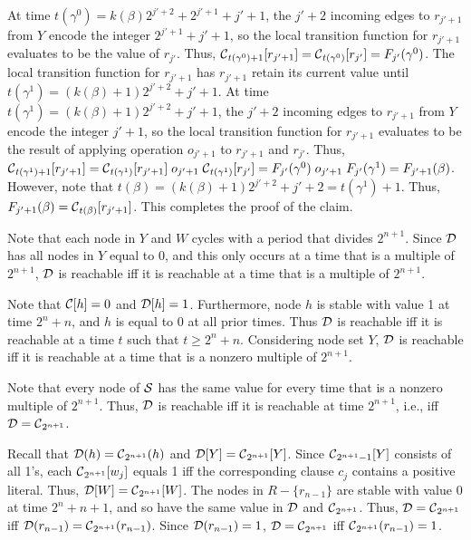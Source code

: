 At time $t(\gamma^0) = k(\beta)2^{j'+2}+2^{j'+1}+j'+1$,
the $j'+2$ incoming edges to $r_{j'+1}$ from $Y$ encode the integer $2^{j'+1}+j'+1$,
so the local transition function for $r_{j'+1}$ evaluates to be the value of $r_{j'}$.
Thus, $\mbox{$\mathcal{C}$}_{t(\gamma^0)+1}[r_{j'+1}] = \mbox{$\mathcal{C}$}_{t(\gamma^0)}[r_{j'}] = F_{j'}(\gamma^0)$.
The local transition function for $r_{j'+1}$ has $r_{j'+1}$ retain its current value until 
$t(\gamma^1) = (k(\beta)+1)2^{j'+2}+j'+1$.
At time $t(\gamma^1) =  (k(\beta)+1)2^{j'+2}+j'+1$,
the $j'+2$ incoming edges to $r_{j'+1}$ from $Y$ encode the integer $j'+1$,
so the local transition function for $r_{j'+1}$ evaluates to be the result
of applying operation $o_{j'+1}$ to  $r_{j'+1}$ and $r_{j'}$.
Thus, 
$\mbox{$\mathcal{C}$}_{t(\gamma^1)+1}[r_{j'+1}] = 
 \mbox{$\mathcal{C}$}_{t(\gamma^1)}[r_{j'+1}]  \; o_{j'+1} \; \mbox{$\mathcal{C}$}_{t(\gamma^1)}[r_{j'}] 
= F_{j'}(\gamma^0)  \; o_{j'+1} \; F_{j'}(\gamma^1) = F_{j'+1}(\beta)$.
However, note that $t(\beta) = (k(\beta) + 1)2^{j'+2}+j'+2 =  t(\gamma^1)+1$.
Thus, $F_{j'+1}(\beta) = \mbox{$\mathcal{C}$}_{t(\beta)}[r_{j'+1}]$.
This completes the proof of the claim.

\bigskip

Note that each node in $Y$ and $W$ cycles with a period that divides $2^{n+1}$.
Since $\mbox{$\mathcal{D}$}$ has all nodes in $Y$ equal to 0, 
and this only occurs at a time that is a multiple of $2^{n+1}$,
$\mbox{$\mathcal{D}$}$ is reachable  iff it is reachable at a time that is a multiple of $2^{n+1}$.

Note that $\mbox{$\mathcal{C}$}[h]=0$ and $\mbox{$\mathcal{D}$}[h]=1$.
Furthermore, node $h$ is stable with value 1 at time $2^n+n$, 
and $h$ is equal to 0 at all prior times.
Thus $\mbox{$\mathcal{D}$}$ is reachable iff it is reachable at a time $t$ such that $t \geq 2^n+n$.
Considering node set $Y$, 
$\mbox{$\mathcal{D}$}$ is reachable iff it is reachable  at a time that is a nonzero multiple of $2^{n+1}$.

Note that every node of $\mbox{$\mathcal{S}$}$ 
has the same value for every time that is a  nonzero multiple of $2^{n+1}$.
Thus, $\mbox{$\mathcal{D}$}$ is reachable  iff it is reachable at time $2^{n+1}$,
i.e., iff $\mbox{$\mathcal{D}$} = \mbox{$\mathcal{C}$}_{2^{n+1}}$.

Recall that $\mbox{$\mathcal{D}$}(h) = \mbox{$\mathcal{C}$}_{2^{n+1}}(h)$ and $\mbox{$\mathcal{D}$}[Y] = \mbox{$\mathcal{C}$}_{2^{n+1}}[Y]$.
Since $\mbox{$\mathcal{C}$}_{2^{n+1}-1}[Y]$ consists of all 1's,
each $\mbox{$\mathcal{C}$}_{2^{n+1}}[w_j]$ equals 1 iff the corresponding clause $c_j$ contains a positive literal.
Thus, $\mbox{$\mathcal{D}$}[W] = \mbox{$\mathcal{C}$}_{2^{n+1}}[W]$.
The nodes in $R - \{r_{n-1}\}$ are stable with value 0 at time $2^n+n+1$,
and so have the same value in $\mbox{$\mathcal{D}$}$ and $\mbox{$\mathcal{C}$}_{2^{n+1}}$.
Thus, $\mbox{$\mathcal{D}$} = \mbox{$\mathcal{C}$}_{2^{n+1}}$ iff $\mbox{$\mathcal{D}$}(r_{n-1}) = \mbox{$\mathcal{C}$}_{2^{n+1}}(r_{n-1})$.
Since $\mbox{$\mathcal{D}$}(r_{n-1}) = 1$, $\mbox{$\mathcal{D}$} = \mbox{$\mathcal{C}$}_{2^{n+1}}$ iff
$\mbox{$\mathcal{C}$}_{2^{n+1}}(r_{n-1}) = 1$.

